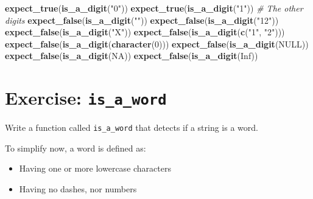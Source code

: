\documentclass[]{book}
\newenvironment{Shaded}{}{}
\newcommand{\CommentTok}[1]{\textcolor[rgb]{0.38,0.63,0.69}{\textit{#1}}}
\newcommand{\ControlFlowTok}[1]{\textcolor[rgb]{0.00,0.44,0.13}{\textbf{#1}}}
\newcommand{\DecValTok}[1]{\textcolor[rgb]{0.25,0.63,0.44}{#1}}
\newcommand{\KeywordTok}[1]{\textcolor[rgb]{0.00,0.44,0.13}{\textbf{#1}}}
\newcommand{\NormalTok}[1]{#1}
\newcommand{\OperatorTok}[1]{\textcolor[rgb]{0.40,0.40,0.40}{#1}}
\newcommand{\OtherTok}[1]{\textcolor[rgb]{0.00,0.44,0.13}{#1}}
\newcommand{\StringTok}[1]{\textcolor[rgb]{0.25,0.44,0.63}{#1}}
\providecommand{\tightlist}{%
  \setlength{\itemsep}{0pt}\setlength{\parskip}{0pt}}
\begin{document}
\begin{Shaded}
\end{Shaded}

\begin{Shaded}
\begin{Highlighting}[]
\KeywordTok{expect_true}\NormalTok{(}\KeywordTok{is_a_digit}\NormalTok{(}\StringTok{"0"}\NormalTok{))}
\KeywordTok{expect_true}\NormalTok{(}\KeywordTok{is_a_digit}\NormalTok{(}\StringTok{"1"}\NormalTok{))}
\CommentTok{# The other digits}
\KeywordTok{expect_false}\NormalTok{(}\KeywordTok{is_a_digit}\NormalTok{(}\StringTok{""}\NormalTok{))}
\KeywordTok{expect_false}\NormalTok{(}\KeywordTok{is_a_digit}\NormalTok{(}\StringTok{"12"}\NormalTok{))}
\KeywordTok{expect_false}\NormalTok{(}\KeywordTok{is_a_digit}\NormalTok{(}\StringTok{"X"}\NormalTok{))}
\KeywordTok{expect_false}\NormalTok{(}\KeywordTok{is_a_digit}\NormalTok{(}\KeywordTok{c}\NormalTok{(}\StringTok{"1"}\NormalTok{, }\StringTok{"2"}\NormalTok{)))}
\KeywordTok{expect_false}\NormalTok{(}\KeywordTok{is_a_digit}\NormalTok{(}\KeywordTok{character}\NormalTok{(}\DecValTok{0}\NormalTok{)))}
\KeywordTok{expect_false}\NormalTok{(}\KeywordTok{is_a_digit}\NormalTok{(}\OtherTok{NULL}\NormalTok{))}
\KeywordTok{expect_false}\NormalTok{(}\KeywordTok{is_a_digit}\NormalTok{(}\OtherTok{NA}\NormalTok{))}
\KeywordTok{expect_false}\NormalTok{(}\KeywordTok{is_a_digit}\NormalTok{(}\OtherTok{Inf}\NormalTok{))}
\end{Highlighting}
\end{Shaded}

\hypertarget{exercise-is_a_word}{%
\section{\texorpdfstring{Exercise: \texttt{is\_a\_word}}{Exercise: is\_a\_word}}\label{exercise-is_a_word}}

Write a function called \texttt{is\_a\_word} that detects if a string is a word.

To simplify now, a word is defined as:

\begin{itemize}
\tightlist
\item
  Having one or more lowercase characters
\item
  Having no dashes, nor numbers
\end{itemize}
\end{document}
